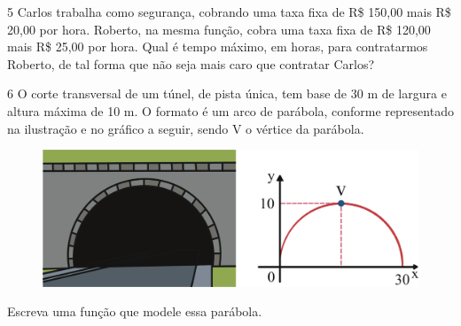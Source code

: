 \pagebreak
\num{5} Carlos trabalha como segurança, cobrando uma taxa fixa de R\$ 150,00 mais
R\$ 20,00 por hora. Roberto, na mesma função, cobra uma taxa fixa de R\$ 120,00
mais R\$ 25,00 por hora. Qual é tempo máximo, em horas, para contratarmos Roberto,
de tal forma que não seja mais caro que contratar Carlos?

\begin{emptybox}

\end{emptybox}

\num{6} O corte transversal de um túnel, de pista única, tem base de 30 m de largura
e altura máxima de 10 m. O formato é um arco de parábola, conforme representado na
ilustração e no gráfico a seguir, sendo V o vértice da parábola.

\begin{figure}[htpb!]
\centering
\includegraphics[width=\textwidth]{./ilustras-mat/modulo_9-atividade_6.png}
\end{figure}

Escreva uma função que modele essa parábola.

\begin{emptybox}
\end{emptybox}

